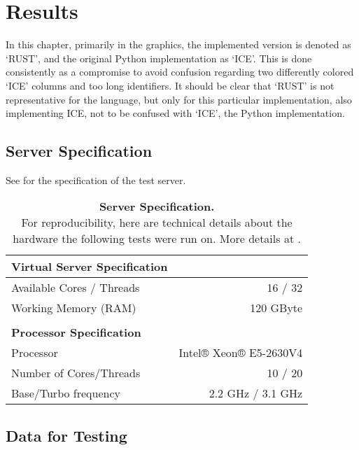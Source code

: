 \chapter{Results}\label{chap:results}

In this chapter, primarily in the graphics, the implemented version is denoted
as `RUST', and the original Python implementation as `ICE'. This is done
consistently as a compromise to avoid confusion regarding two differently
colored `ICE' columns and too long identifiers. It should be clear that `RUST'
is not representative for the language, but only for this particular
implementation, also implementing ICE, not to be confused with `ICE', the
Python implementation.

\section{Server Specification}\label{sec:specs}

See  for the specification of the test server.

\begin{table}[ht]
    \begin{tabular}{@{}lr@{}}
        \textbf{Virtual Server Specification} & \\
        \midrule
        Available Cores / Threads & 16 / 32 \\
        Working Memory (RAM) & 120 GByte \\ \\
        \textbf{Processor Specification} & \\
        \midrule
        Processor & Intel® Xeon® E5-2630V4 \\
        Number of Cores/Threads & 10 / 20 \\
        Base/Turbo frequency & 2.2 GHz / 3.1 GHz \\
    \end{tabular}
    \caption[Server Specification]
    {\textbf{Server Specification.} \\
    For reproducibility, here are technical details about the hardware the
    following tests were run on. More details at \cite{processor}.}
    \label{tab:specs}
\end{table}



\newpage
\section{Data for Testing}\label{sec:data}

